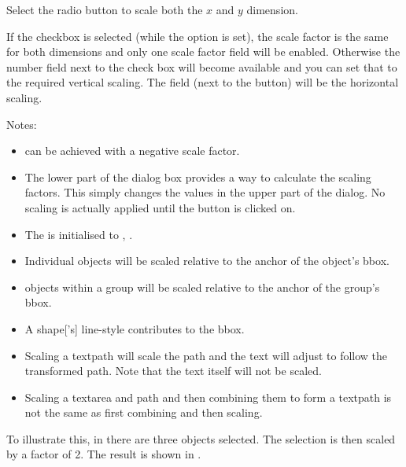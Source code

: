 
Select the  radio button to scale both the
$x$ and $y$ dimension.

If the  checkbox is selected (while the
 option is set), the scale
factor is the same for both dimensions and only one scale factor
field will be enabled. Otherwise the 
number field next to the  check box will
become available and you can set that to the required vertical
scaling. The  field (next to the
 button) will be the horizontal scaling.

Notes:
\begin{itemize}
\item {} can be
achieved with a negative scale factor.

\item The lower  part of the  dialog box
provides a way to calculate the scaling factors. This simply changes
the values in the upper part of the dialog. No scaling is actually
applied until the  button is clicked on.

\item The  is initialised to
, .

\item Individual \glspl*{object} will be
scaled relative to the anchor of the object's \gls{bbox}.

\item \Glspl*{object} within a
\gls{group} will be scaled relative to the anchor
of the group's \gls*{bbox}.

\item A \gls*{shape}['s] \gls{line-style} contributes to the \gls{bbox}. 

\item Scaling a \gls{textpath} will scale the path and the text
will adjust to follow the transformed path. Note that the text
itself will not be scaled.

\item Scaling a \gls*{textarea} and \gls*{path} and then combining
them to form a \gls*{textpath} is not the same as first combining
and then scaling.
\end{itemize}

To illustrate this, in  there are three
\glspl*{object} selected.
The selection is then scaled by a factor of 2.
The result is shown in .

